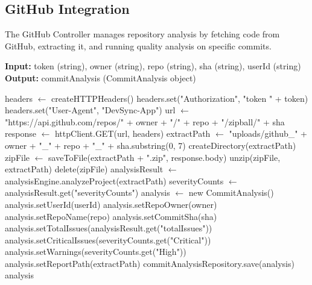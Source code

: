 \documentclass[12pt,a4paper]{article}
\begin{document}
    \subsection{GitHub Integration}

    The GitHub Controller manages repository analysis by fetching code from GitHub, extracting it, and running quality analysis on specific commits.

    \begin{algorithm}[H]
        \caption{analyzeCommit}
        \textbf{Input:} token (string), owner (string), repo (string), sha (string), userId (string)\\
        \textbf{Output:} commitAnalysis (CommitAnalysis object)
        \begin{algorithmic}[1]
            \State headers $\gets$ createHTTPHeaders()
            \State headers.set("Authorization", "token " + token)
            \State headers.set("User-Agent", "DevSync-App")
            \State url $\gets$ "https://api.github.com/repos/" + owner + "/" + repo + "/zipball/" + sha
            \State response $\gets$ httpClient.GET(url, headers)
            \State extractPath $\gets$ "uploads/github\_" + owner + "\_" + repo + "\_" + sha.substring(0, 7)
            \State createDirectory(extractPath)
            \State zipFile $\gets$ saveToFile(extractPath + ".zip", response.body)
            \State unzip(zipFile, extractPath)
            \State delete(zipFile)
            \State analysisResult $\gets$ analysisEngine.analyzeProject(extractPath)
            \State severityCounts $\gets$ analysisResult.get("severityCounts")
            \State analysis $\gets$ new CommitAnalysis()
            \State analysis.setUserId(userId)
            \State analysis.setRepoOwner(owner)
            \State analysis.setRepoName(repo)
            \State analysis.setCommitSha(sha)
            \State analysis.setTotalIssues(analysisResult.get("totalIssues"))
            \State analysis.setCriticalIssues(severityCounts.get("Critical"))
            \State analysis.setWarnings(severityCounts.get("High"))
            \State analysis.setReportPath(extractPath)
            \State commitAnalysisRepository.save(analysis)
            \Return analysis
        \end{algorithmic}
    \end{algorithm}
\end{document}
